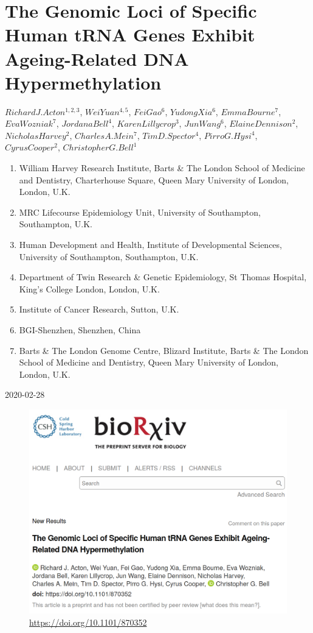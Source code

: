\documentclass[
]{book}
\providecommand{\tightlist}{%
  \setlength{\itemsep}{0pt}\setlength{\parskip}{0pt}}
\begin{document}
\hypertarget{tRNApaper}{%
\chapter{The Genomic Loci of Specific Human tRNA Genes Exhibit Ageing-Related DNA Hypermethylation}\label{tRNApaper}}

\(Richard J. Acton ^{1,2,3}\), \(Wei Yuan ^{4,5}\), \(Fei Gao ^{6}\), \(Yudong Xia ^{6}\), \(Emma Bourne ^{7}\), \(Eva Wozniak ^{7}\), \(Jordana Bell ^{4}\), \(Karen Lillycrop ^{3}\), \(Jun Wang ^{6}\), \(Elaine Dennison ^{2}\), \(Nicholas Harvey ^{2}\), \(Charles A. Mein ^{7}\), \(Tim D. Spector ^{4}\), \(Pirro G. Hysi ^{4}\), \(Cyrus Cooper ^{2}\), \(Christopher G. Bell ^{1}\)

\begin{enumerate}
\def\labelenumi{\arabic{enumi}.}
\tightlist
\item
  William Harvey Research Institute, Barts \& The London School of Medicine and Dentistry, Charterhouse Square, Queen Mary University of London, London, U.K.
\item
  MRC Lifecourse Epidemiology Unit, University of Southampton, Southampton, U.K.
\item
  Human Development and Health, Institute of Developmental Sciences, University of Southampton, Southampton, U.K.\\
\item
  Department of Twin Research \& Genetic Epidemiology, St Thomas Hospital, King's College London, London, U.K.
\item
  Institute of Cancer Research, Sutton, U.K.
\item
  BGI-Shenzhen, Shenzhen, China
\item
  Barts \& The London Genome Centre, Blizard Institute, Barts \& The London School of Medicine and Dentistry, Queen Mary University of London, London, U.K.
\end{enumerate}

2020-02-28

\begin{figure}
\centering
\includegraphics{figs/biorxiv_screenshot.png}
\caption{\url{https://doi.org/10.1101/870352}}
\end{figure}
\end{document}
